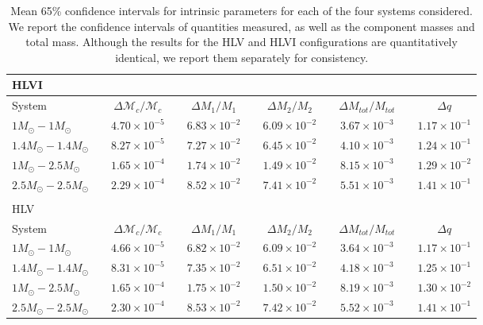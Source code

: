 \documentclass[11pt,a4paper]{emulateapj}
\newcommand{\chmass}{\mathcal{M}_c}
\begin{document}
\begin{table}[t!]
\centering
\caption{Mean 65\% confidence intervals for intrinsic parameters for each of the four systems considered.  We report the confidence intervals of quantities measured, as well as the component masses and total mass.  Although the results for the 
HLV and HLVI configurations are quantitatively identical, we report them separately for consistency.}
\begin{tabular}{lcccccccccc}

\\HLVI\\
\hline\hline
System & \vline &  $\Delta \chmass / \chmass$ & \vline & $\Delta M_1 / M_1$ & \vline & $\Delta M_2 / M_2$ & \vline & $\Delta M_{tot}/M_{tot}$ & \vline & $\Delta q$\\
\hline\hline
$1M_{\odot}-1M_{\odot}$ & \vline & $4.70\times 10^{-5}$ & \vline & $6.83\times 10^{-2}$ & \vline & $6.09\times 10^{-2}$ & \vline & $3.67\times 10^{-3}$ & \vline & $1.17\times 10^{-1}$\\
\hline
$1.4M_{\odot}-1.4M_{\odot}$ & \vline & $8.27\times 10^{-5}$ & \vline & $7.27\times 10^{-2}$ & \vline & $6.45\times 10^{-2}$ & \vline & $4.10\times 10^{-3}$ & \vline & $1.24\times 10^{-1}$ \\
\hline
$1M_{\odot}-2.5M_{\odot}$ & \vline & $1.65\times 10^{-4}$ & \vline & $1.74\times 10^{-2}$ & \vline & $1.49\times 10^{-2}$ & \vline & $8.15\times 10^{-3}$ & \vline & $1.29\times 10^{-2}$\\\hline
$2.5M_{\odot}-2.5M_{\odot}$ & \vline & $2.29\times 10^{-4}$ & \vline & $8.52\times 10^{-2}$ & \vline & $7.41\times 10^{-2}$ & \vline & $5.51\times 10^{-3}$ & \vline & $1.41\times 10^{-1}$\\
\hline\hline

\\
HLV\\

\hline\hline
System & \vline &  $\Delta \chmass / \chmass$ & \vline & $\Delta M_1 / M_1$ & \vline & $\Delta M_2 / M_2$ & \vline & $\Delta M_{tot}/M_{tot}$ & \vline & $\Delta q$\\
\hline\hline
$1M_{\odot}-1M_{\odot}$ & \vline & $4.66\times 10^{-5}$ & \vline & $6.82\times 10^{-2}$ & \vline & $6.09\times 10^{-2}$ & \vline & $3.64\times 10^{-3}$ & \vline & $1.17\times 10^{-1}$ \\
\hline
$1.4M_{\odot}-1.4M_{\odot}$ & \vline & $8.31\times 10^{-5}$ & \vline & $7.35\times 10^{-2}$ & \vline & $6.51\times 10^{-2}$ & \vline & $4.18\times 10^{-3}$ & \vline & $1.25\times 10^{-1}$\\
\hline
$1M_{\odot}-2.5M_{\odot}$ & \vline & $1.65\times 10^{-4}$ & \vline & $1.75\times 10^{-2}$ & \vline & $1.50\times 10^{-2}$ & \vline & $8.19\times 10^{-3}$ & \vline & $1.30\times 10^{-2}$ \\
\hline
$2.5M_{\odot}-2.5M_{\odot}$ & \vline & $2.30\times 10^{-4}$ & \vline & $8.53\times 10^{-2}$ & \vline & $7.42\times 10^{-2}$ & \vline & $5.52\times 10^{-3}$ & \vline & $1.41\times 10^{-1}$ \\
\hline\hline


\end{tabular}
\label{ciTableIntrinsic}
\end{table}
\end{document}
